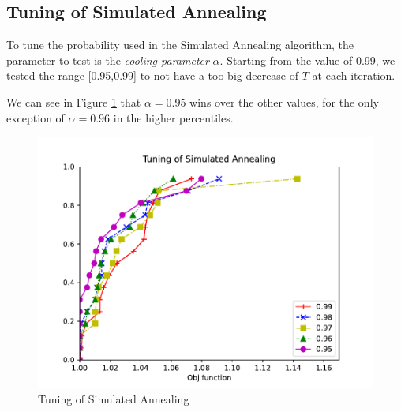 \subsection{Tuning of Simulated Annealing}

To tune the probability used in the Simulated Annealing algorithm, the parameter to test is the \textit{cooling parameter} $\alpha$. Starting from the value of 0.99, we tested the range [0.95,0.99] to not have a too big decrease of $T$ at each iteration.

We can see in Figure \ref*{fig:sa} that $\alpha = 0.95$ wins over the other values, for the only exception of $\alpha = 0.96$ in the higher percentiles.

\begin{figure}[!h]
    \centering
    \includegraphics[width=\textwidth]{images/sa.pdf}
    \caption{Tuning of Simulated Annealing}
    \label{fig:sa}
\end{figure}
